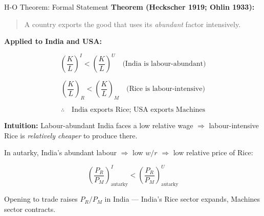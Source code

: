 \documentclass[
  ignorenonframetext,
  aspectratio=169,
]{beamer}
\makeatletter
\let\quarto@originallabel\label
\DeclareRobustCommand*{\label}[1]{\quarto@originallabel{#1}}
\makeatother
\begin{document}
\begin{frame}{H-O Theorem: Formal Statement}
\label{h-o-theorem-formal-statement}
\textbf{Theorem (Heckscher 1919; Ohlin 1933):}

\begin{quote}
A country exports the good that uses its \emph{abundant} factor
intensively.
\end{quote}

\textbf{Applied to India and USA:}

\[\left(\frac{K}{L}\right)^I < \left(\frac{K}{L}\right)^U \quad \text{(India is labour-abundant)}\]

\[\left(\frac{K}{L}\right)_R < \left(\frac{K}{L}\right)_M \quad \text{(Rice is labour-intensive)}\]

\[\therefore \quad \text{India exports Rice; USA exports Machines}\]

\textbf{Intuition:} Labour-abundant India faces a low relative wage
\(\Rightarrow\) labour-intensive Rice is \emph{relatively cheaper} to
produce there.

In autarky, India's abundant labour \(\Rightarrow\) low \(w/r\)
\(\Rightarrow\) low relative price of Rice:

\[\left(\frac{P_R}{P_M}\right)^I_{\text{autarky}} < \left(\frac{P_R}{P_M}\right)^U_{\text{autarky}}\]

Opening to trade raises \(P_R/P_M\) in India --- India's Rice sector
expands, Machines sector contracts.
\end{frame}
\end{document}
